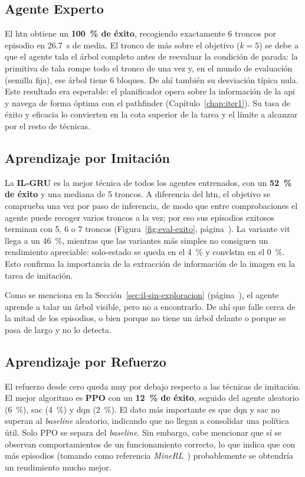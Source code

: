 \subsection{Agente Experto}
El \gls{htn} obtiene un \textbf{\qty{100}{\percent} de éxito}, recogiendo exactamente \num{6} troncos por
episodio en \qty{26.7}{\second} de media. El tronco de más sobre el objetivo ($k=\num{5}$) se debe a
que el agente tala el árbol completo antes de reevaluar la condición de parada: la primitiva
de tala rompe todo el tronco de una vez y, en el mundo de evaluación (\gls{semilla} fija), ese árbol
tiene \num{6} bloques. De ahí también su desviación típica nula.
Este resultado era esperable: el planificador opera sobre la información
de la \acrshort{api} y navega de forma óptima con el \gls{pathfinder}
(Capítulo~\ref{chap:iter1}). Su tasa de éxito y eficacia lo convierten en la cota superior 
de la tarea y el límite a alcanzar por el resto de técnicas.

\subsection{Aprendizaje por Imitación}
La \textbf{IL-GRU} es la mejor técnica de todos los agentes
entrenados, con un \textbf{\qty{52}{\percent} de éxito} y una mediana de \num{5} troncos. A diferencia del \gls{htn}, el objetivo se
comprueba una vez por paso de inferencia, de modo que entre comprobaciones el agente puede
recoger varios troncos a la vez; por eso sus episodios exitosos terminan con \num{5}, \num{6} o \num{7}
troncos (Figura~\ref{fig:eval-exito}, página~\pageref{fig:eval-exito}).
La variante \gls{vit} llega a un \qty{46}{\percent}, mientras que las
variantes más simples no consiguen un rendimiento apreciable: solo-estado se queda en el \qty{4}{\percent}
y \gls{convlstm} en el \qty{0}{\percent}. Esto confirma la importancia de la extracción de información de la
imagen en la tarea de imitación. 

Como se menciona en la Sección~\ref{sec:il-sin-exploracion} (página~\pageref{sec:il-sin-exploracion}), el agente aprende
a talar un árbol visible, pero no a encontrarlo. De ahí que falle cerca de la
mitad de los episodios, o bien porque no tiene un árbol delante o porque se pasa de largo y no lo detecta.

\subsection{Aprendizaje por Refuerzo}
El refuerzo desde cero queda muy por debajo respecto a las técnicas de imitación.
El mejor algoritmo es \textbf{PPO} con un
\textbf{\qty{12}{\percent} de éxito}, seguido del agente aleatorio (\qty{6}{\percent}), \gls{sac} (\qty{4}{\percent}) y
\gls{dqn} (\qty{2}{\percent}). El dato más importante es que \gls{dqn} y \gls{sac} no superan al
\textit{\gls{baseline}} aleatorio, indicando que no llegan a consolidar una política útil. 
Solo PPO se separa del \textit{\gls{baseline}}. Sin embargo, cabe mencionar que sí se observan
comportamientos de un funcionamiento correcto, lo que indica que con más episodios (tomando como
referencia \textit{MineRL}~\cite{guss2019minerl}) probablemente se obtendría un rendimiento mucho mejor.

